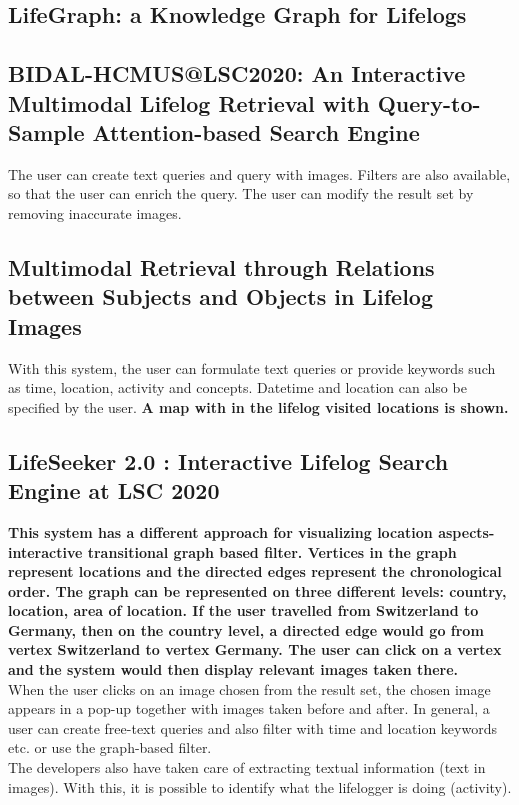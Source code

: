 \subsection{LifeGraph: a Knowledge Graph for Lifelogs}

\subsection{BIDAL-HCMUS@LSC2020: An Interactive Multimodal Lifelog Retrieval with Query-to-Sample Attention-based Search Engine}
The user can create text queries and query with images. Filters are also available, so that the user can enrich the query. The user can modify the result set by removing inaccurate images.

\subsection{Multimodal Retrieval through Relations between Subjects and Objects in Lifelog Images}
With this system, the user can formulate text queries or provide keywords such as time, location, activity and concepts.
Datetime and location can also be specified by the user. \textbf{A map with in the lifelog visited locations is shown.}

\subsection{LifeSeeker 2.0 : Interactive Lifelog Search Engine at LSC 2020}
\textbf{This system has a different approach for visualizing location aspects-interactive transitional graph based filter. Vertices in the graph represent locations and the directed edges represent the chronological order. The graph can be represented on three different levels: country, location, area of location. If the user travelled from Switzerland to Germany, then on the country level, a directed edge would go from vertex Switzerland to vertex Germany. The user can click on a vertex and the system would then display relevant images taken there.}\\

When the user clicks on an image chosen from the result set, the chosen image appears in a pop-up together with images taken before and after.
In general, a user can create free-text queries and also filter with time and location keywords etc. or use the graph-based filter.\\

The developers also have taken care of extracting textual information (text in images). With this, it is possible to identify what the lifelogger is doing (activity).